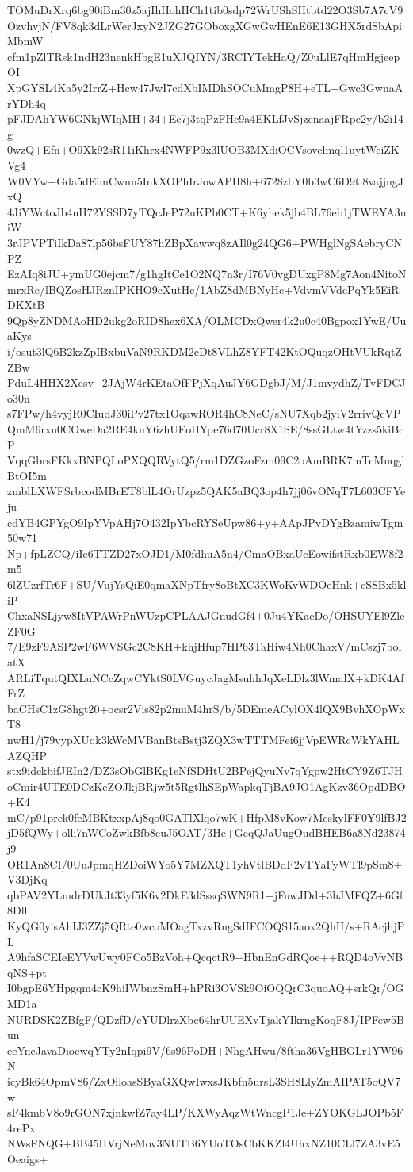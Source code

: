 TOMuDrXrq6bg90iBm30z5ajIhHohHCh1tib0sdp72WrUShSHtbtd22O3Sb7A7cV9
OzvhvjN/FV8qk3dLrWerJxyN2JZG27GOboxgXGwGwHEnE6E13GHX5rdSbApiMbmW
cfm1pZlTRsk1ndH23nenkHbgE1uXJQIYN/3RCIYTekHaQ/Z0uLlE7qHmHgjeepOI
XpGYSL4Ka5y2IrrZ+Hcw47JwI7cdXbIMDhSOCuMmgP8H+eTL+Gwc3GwnaArYDh4q
pFJDAhYW6GNkjWIqMH+34+Ec7j3tqPzFHc9a4EKLfJvSjzcnaajFRpe2y/b2i14g
0wzQ+Efn+O9Xk92sR11iKhrx4NWFP9x3lUOB3MXdiOCVsovclmql1uytWciZKVg4
W0VYw+Gda5dEimCwnn5InkXOPhIrJowAPH8h+6728zbY0b3wC6D9tl8vajjngJxQ
4JiYWctoJb4nH72YSSD7yTQcJeP72uKPb0CT+K6yhek5jb4BL76eb1jTWEYA3niW
3rJPVPTiIkDa87lp56bsFUY87hZBpXawwq8zAIl0g24QG6+PWHglNgSAebryCNPZ
EzAIq8iJU+ymUG0ejcm7/g1hgItCe1O2NQ7n3r/I76V0vgDUxgP8Mg7Aon4NitoN
mrxRc/lBQZosHJRznIPKHO9cXutHc/1AbZ8dMBNyHc+VdvmVVdcPqYk5EiRDKXtB
9Qp8yZNDMAoHD2ukg2oRID8hex6XA/OLMCDxQwer4k2u0c40Bgpox1YwE/UuaKys
i/osut3lQ6B2kzZpIBxbuVaN9RKDM2cDt8VLhZ8YFT42KtOQuqzOHtVUkRqtZZBw
PduL4HHX2Xesv+2JAjW4rKEtaOfFPjXqAuJY6GDgbJ/M/J1mvydhZ/TvFDCJo30n
s7FPw/h4vyjR0CIudJ30iPv27tx1OqawROR4hC8NeC/sNU7Xqb2jyiV2rrivQcVP
QmM6rxu0COweDa2RE4kuY6zhUEoHYpe76d70Ucr8X1SE/8ssGLtw4tYzzs5kiBcP
VqqGbrsFKkxBNPQLoPXQQRVytQ5/rm1DZGzoFzm09C2oAmBRK7mTcMuqglBtOI5m
zmblLXWFSrbcodMBrET8blL4OrUzpz5QAK5aBQ3op4h7jj06vONqT7L603CFYeju
cdYB4GPYgO9IpYVpAHj7O432IpYbcRYSeUpw86+y+AApJPvDYgBzamiwTgm50w71
Np+fpLZCQ/iIe6TTZD27xOJD1/M0fdhuA5n4/CmaOBxaUcEowifstRxb0EW8f2m5
6lZUzrfTr6F+SU/VujYsQiE0qmaXNpTfry8oBtXC3KWoKvWDOeHnk+cSSBx5kliP
ChxaNSLjyw8ItVPAWrPnWUzpCPLAAJGnudGf4+0Ju4YKacDo/OHSUYEl9ZleZF0G
7/E9zF9ASP2wF6WVSGc2C8KH+khjHfup7HP63TaHiw4Nh0ChaxV/mCszj7bolatX
ARLiTqutQIXLuNCcZqwCYktS0LVGuycJagMsuhhJqXeLDlz3lWmalX+kDK4AfFrZ
baCHsC1zG8hgt20+ocsr2Vis82p2muM4hrS/b/5DEmeACylOX4lQX9BvhXOpWxT8
nwH1/j79vypXUqk3kWcMVBanBtsBstj3ZQX3wTTTMFei6jjVpEWRcWkYAHLAZQHP
stx9idckbifJEIn2/DZ3sObGlBKg1eNfSDHtU2BPejQyuNv7qYgpw2HtCY9Z6TJH
oCmir4UTE0DCzKeZOJkjBRjw5t5RgtlhSEpWapkqTjBA9JO1AgKzv36OpdDBO+K4
mC/p91prck0feMBKtxxpAj8qo0GATlXlqo7wK+HfpM8vKow7McskylFF0Y9lfBJ2
jD5fQWy+olli7nWCoZwkBfb8euJ5OAT/3He+GeqQJaUugOudBHEB6a8Nd23874j9
OR1An8CI/0UuJpmqHZDoiWYo5Y7MZXQT1yhVtlBDdF2vTYaFyWTl9pSm8+V3DjKq
qbPAV2YLmdrDUkJt33yf5K6v2DkE3dSssqSWN9R1+jFuwJDd+3hJMFQZ+6Gf8Dll
KyQG0yisAhIJ3ZZj5QRte0wcoMOagTxzvRngSdIFCOQS15aox2QhH/s+RAcjhjPL
A9hfaSCEIeEYVwUwy0FCo5BzVoh+QcqctR9+HbnEnGdRQoe++RQD4oVvNBqNS+pt
I0bgpE6YHpgqm4cK9hiIWbnzSmH+hPRi3OVSk9OiOQQrC3quoAQ+srkQr/OGMD1a
NURDSK2ZBfgF/QDzfD/cYUDlrzXbe64hrUUEXvTjakYIkrngKoqF8J/IPFew5Bun
eeYneJavaDioewqYTy2nIqpi9V/6s96PoDH+NhgAHwu/8ftha36VgHBGLr1YW96N
icyBk64OpmV86/ZxOiloasSByaGXQwIwxsJKbfn5ursL3SH8LlyZmAIPAT5oQV7w
sF4kmbV8o9rGON7xjnkwfZ7ay4LP/KXWyAqzWtWncgP1Je+ZYOKGLJOPb5F4rePx
NWsFNQG+BB45HVrjNeMov3NUTB6YUoTOsCbKKZl4UhxNZ10CLl7ZA3vE5Oeaigs+
